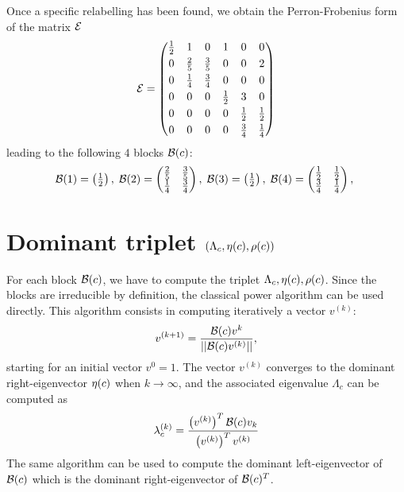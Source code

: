 \documentclass{article}
\begin{document}
%
Once a specific relabelling has been found, we obtain the Perron-Frobenius form of the matrix $\mathcal{E}$
\begin{equation}
\mathcal{E} = \begin{pmatrix}
\frac{1}{2}& 1& 0& 1& 0& 0\\[0.1cm]
0& \frac{2}{5}& \frac{3}{5}& 0& 0& 2\\[0.1cm]
0& \frac{1}{4}& \frac{3}{4}& 0& 0& 0\\[0.1cm]
0& 0& 0& \frac{1}{2}& 3& 0\\[0.1cm]
0& 0& 0& 0& \frac{1}{2}& \frac{1}{2}\\[0.1cm]
0& 0& 0& 0& \frac{3}{4}& \frac{1}{4}
\end{pmatrix}
\end{equation}
leading to the following $4$ blocks $\mathcal B(c)$: %
\begin{equation}
 \mathcal B(1) = \begin{pmatrix}
\frac{1}{2}
\end{pmatrix},\;  \mathcal B(2) = \begin{pmatrix}
\frac{2}{5}& \frac{3}{5}\\
\frac{1}{4}& \frac{3}{4}
\end{pmatrix},\;  \mathcal B(3) = \begin{pmatrix}
\frac{1}{2}
\end{pmatrix},\;  \mathcal B(4) = \begin{pmatrix}
\frac{1}{2}& \frac{1}{2}\\
\frac{3}{4}& \frac{1}{4}
\end{pmatrix},\; 
\end{equation}

\section{ Dominant triplet $\left(\Lambda _c, \eta(c), \rho(c)\right)$}
For each block $\mathcal B(c)$, we have to compute the triplet $\Lambda _c, \eta(c), \rho(c)$.
Since the blocks are irreducible by definition, the classical power algorithm
can be used directly. This algorithm consists in computing iteratively a vector $v^{(k)}$:
\begin{equation}
v^{(k+1)} = \frac{ \mathcal B(c) v^{k} } {|| \mathcal B(c) v^{(k)}||},
\end{equation}
starting for an initial vector $v^{0}=1$.
The vector $v^{(k)}$ converges to the dominant right-eigenvector $\eta(c)$ when $k \rightarrow \infty$, and the associated eigenvalue $\Lambda _c$ can be computed as
\begin{equation}
\lambda_c^{(k)} =  \frac{ \left(v^{(k)}\right)^T \mathcal B(c) v_k } { \left(v^{(k)}\right)^T v^{(k)} } 
\end{equation}
The same algorithm can be used to compute the dominant left-eigenvector of $\mathcal B(c)$
which is the dominant right-eigenvector of $\mathcal B(c)^T$.
\end{document}
